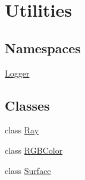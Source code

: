 \hypertarget{group___utilities}{}\section{Utilities}
\label{group___utilities}
\subsection*{Namespaces}
\begin{DoxyCompactItemize}
\item 
 \hyperlink{namespace_logger}{Logger}
\end{DoxyCompactItemize}
\subsection*{Classes}
\begin{DoxyCompactItemize}
\item 
class \hyperlink{class_ray}{Ray}
\item 
class \hyperlink{class_r_g_b_color}{R\+G\+B\+Color}
\item 
class \hyperlink{class_surface}{Surface}
\end{DoxyCompactItemize}
